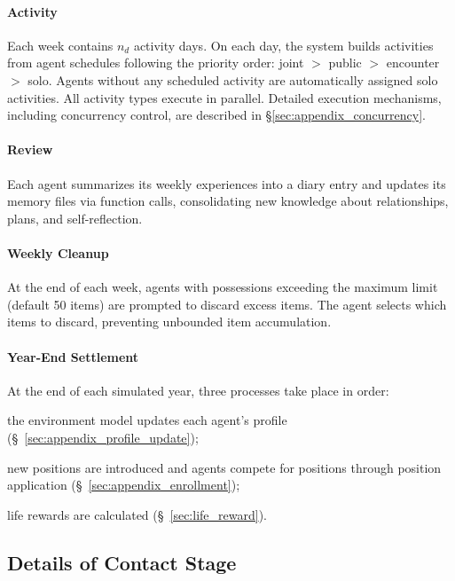 \paragraph{Activity}
Each week contains $n_d$ activity days.
On each day, the system builds activities from agent schedules following the priority order: joint $>$ public $>$ encounter $>$ solo.
Agents without any scheduled activity are automatically assigned solo activities.
All activity types execute in parallel.
Detailed execution mechanisms, including concurrency control, are described in \S\ref{sec:appendix_concurrency}.

\paragraph{Review}
Each agent summarizes its weekly experiences into a diary entry and updates its memory files via function calls, consolidating new knowledge about relationships, plans, and self-reflection.

\paragraph{Weekly Cleanup}
At the end of each week, agents with possessions exceeding the maximum limit (default 50 items) are prompted to discard excess items.
The agent selects which items to discard, preventing unbounded item accumulation.

\paragraph{Year-End Settlement}
At the end of each simulated year, three processes take place in order:
\begin{inparaenum}[\it (1)]
\item the environment model updates each agent's profile (\S~\ref{sec:appendix_profile_update});
\item new positions are introduced and agents compete for positions through position application (\S~\ref{sec:appendix_enrollment});
\item life rewards are calculated (\S~\ref{sec:life_reward}).
\end{inparaenum}

\subsection{Details of Contact Stage}
\label{sec:appendix_contact_details}

